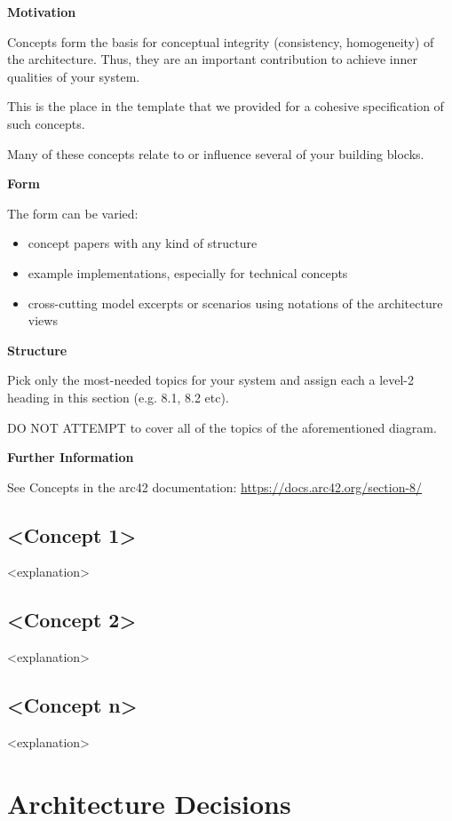 \documentclass[12pt,a4paper]{article}
\newcommand{\minititle}[1]{%
  \par\addvspace{0.6\baselineskip}%
  \noindent\textbf{#1}\par\nobreak%
  \noindent\ignorespaces%
}
\begin{document}
\minititle{Motivation}
Concepts form the basis for conceptual integrity (consistency, homogeneity) of the architecture. Thus, they are an important contribution to achieve inner qualities of your system.

This is the place in the template that we provided for a cohesive specification of such concepts.

Many of these concepts relate to or influence several of your building blocks.

\minititle{Form}
The form can be varied:
\begin{itemize}
  \item concept papers with any kind of structure
  \item example implementations, especially for technical concepts
  \item cross-cutting model excerpts or scenarios using notations of the architecture views
\end{itemize}

\minititle{Structure}
Pick only the most-needed topics for your system and assign each a level-2 heading in this section (e.g. 8.1, 8.2 etc).

DO NOT ATTEMPT to cover all of the topics of the aforementioned diagram.

\minititle{Further Information}
See Concepts in the arc42 documentation:
\href{https://docs.arc42.org/section-8/}{https://docs.arc42.org/section-8/}

\subsection{\textless Concept 1\textgreater}
\textless explanation\textgreater

\subsection{\textless Concept 2\textgreater}
\textless explanation\textgreater

\subsection{\textless Concept n\textgreater}
\textless explanation\textgreater

\section{Architecture Decisions}
\end{document}
